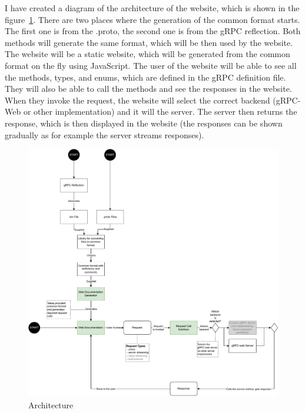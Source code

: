 I have created a diagram of the architecture of the website, which is shown in the figure~\ref{fig:grpcflair-architecture}.
There are two places where the generation of the common format starts.
The first one is from the .proto, the second one is from the gRPC reflection.
Both methods will generate the same format, which will be then used by the website.
The website will be a static website, which will be generated from the common format on the fly using JavaScript.
The user of the website will be able to see all the methods, types, and enums, which are defined in the gRPC definition file.
They will also be able to call the methods and see the responses in the website.
When they invoke the request, the website will select the correct backend (gRPC-Web or other implementation) and it will the server.
The server then returns the response, which is then displayed in the website (the responses can be shown gradually as for example the server streams responses).


\begin{figure}[hbt!]
    \centering
    \captionsetup{justification=centering}
    \includegraphics[width=1.0\textwidth]{images/design/grpcdoc-architecture}
    \caption{Architecture}
    \label{fig:grpcflair-architecture}
\end{figure}


